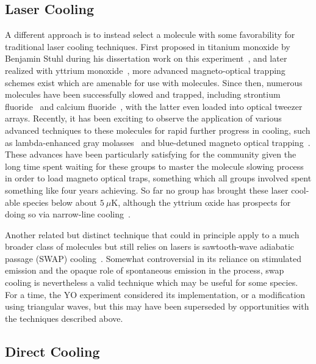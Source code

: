 \subsection{Laser Cooling}

A different approach is to instead select a molecule with some favorability for traditional laser cooling techniques.
First proposed in titanium monoxide by Benjamin Stuhl during his dissertation work on this experiment~\cite{Stuhl2008}, and later realized with yttrium monoxide~\cite{Collopy2018}, more advanced magneto-optical trapping schemes exist which are amenable for use with molecules.
Since then, numerous molecules have been successfully slowed and trapped, including strontium fluoride~\cite{Steinecker2016} and calcium fluoride~\cite{Anderegg2019}, with the latter even loaded into optical tweezer arrays.
Recently, it has been exciting to observe the application of various advanced techniques to these molecules for rapid further progress in cooling, such as lambda-enhanced gray molasses~\cite{Anderegg2018} and blue-detuned magneto optical trapping~\cite{Jarvis2018}.
These advances have been particularly satisfying for the community given the long time spent waiting for these groups to master the molecule slowing process in order to load magneto optical traps, something which all groups involved spent something like four years achieving.
So far no group has brought these laser cool-able species below about $5~\mu$K, although the yttrium oxide has prospects for doing so via narrow-line cooling~\cite{Collopy2015}.

Another related but distinct technique that could in principle apply to a much broader class of molecules but still relies on lasers is sawtooth-wave adiabatic passage (SWAP) cooling~\cite{Bartolotta2018}.
Somewhat controversial in its reliance on stimulated emission and the opaque role of spontaneous emission in the process, swap cooling is nevertheless a valid technique which may be useful for some species.
For a time, the YO experiment considered its implementation, or a modification using triangular waves, but this may have been superseded by opportunities with the techniques described above.

\subsection{Direct Cooling}


